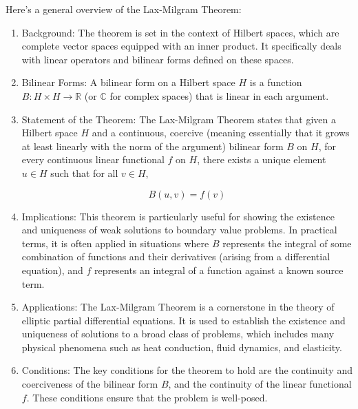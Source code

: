 \documentclass[a4paper,12pt]{article} %
\begin{document}
Here's a general overview of the Lax-Milgram Theorem:
\begin{enumerate}

   \item Background: The theorem is set in the context of Hilbert spaces, which are complete vector spaces equipped with an inner product. It specifically deals with linear operators and bilinear forms defined on these spaces.

   \item Bilinear Forms: A bilinear form on a Hilbert space \( H \) is a function \( B: H \times H \rightarrow \mathbb{R} \) (or \( \mathbb{C} \) for complex spaces) that is linear in each argument.

   \item Statement of the Theorem: The Lax-Milgram Theorem states that given a Hilbert space \( H \) and a continuous, coercive (meaning essentially that it grows at least linearly with the norm of the argument) bilinear form \( B \) on \( H \), for every continuous linear functional \( f \) on \( H \), there exists a unique element \( u \in H \) such that for all \( v \in H \),
   
   \[ B(u, v) = f(v) \]

   \item Implications: This theorem is particularly useful for showing the existence and uniqueness of weak solutions to boundary value problems. In practical terms, it is often applied in situations where \( B \) represents the integral of some combination of functions and their derivatives (arising from a differential equation), and \( f \) represents an integral of a function against a known source term.

   \item Applications: The Lax-Milgram Theorem is a cornerstone in the theory of elliptic partial differential equations. It is used to establish the existence and uniqueness of solutions to a broad class of problems, which includes many physical phenomena such as heat conduction, fluid dynamics, and elasticity.

   \item Conditions: The key conditions for the theorem to hold are the continuity and coerciveness of the bilinear form \( B \), and the continuity of the linear functional \( f \). These conditions ensure that the problem is well-posed.
\end{enumerate}
\end{document}
